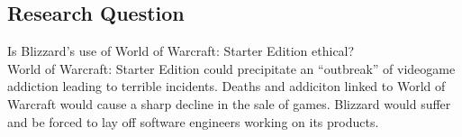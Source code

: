 \documentclass[11pt]{article}
\begin{document}
\begin{multicols}{2}

\section{Research Question}
Is Blizzard's use of World of Warcraft: Starter Edition ethical? \\
World of Warcraft: Starter Edition could precipitate an ``outbreak'' of videogame addiction leading to terrible incidents. \cite{SnowlyDeath} Deaths and addiciton linked to World of Warcraft would cause a sharp decline in the sale of games. Blizzard would suffer and be forced to lay off software engineers working on its products.





\end{multicols}
\end{document}
